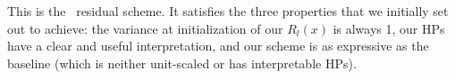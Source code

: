 This is the \umup\ residual scheme. It satisfies the three properties that we initially set out to achieve: the variance at initialization of our $R_l(x)$ is always 1, our HPs have a clear and useful interpretation, and our scheme is as expressive as the baseline (which is neither unit-scaled or has interpretable HPs).



